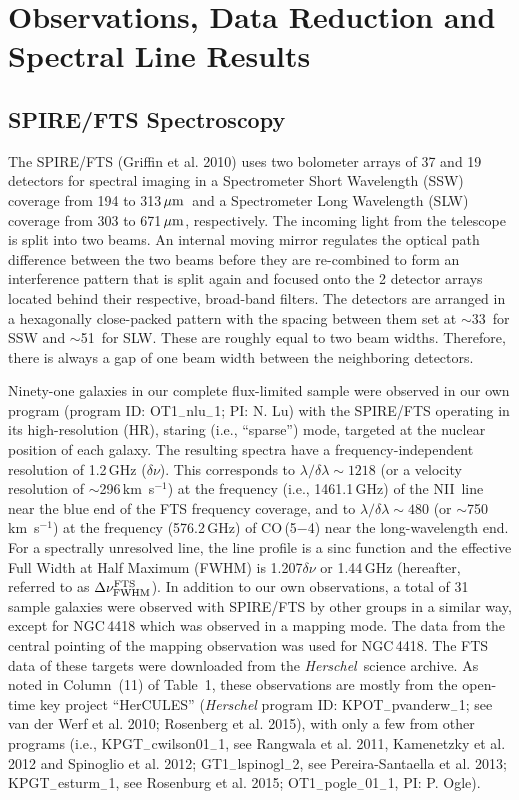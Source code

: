 \documentclass[preprint]{aastex}
\newcommand{\um}{\mbox{$\,\mu{\rm m}$}}
\newcommand{\kms}{\mbox{\,km~s$^{-1}$}}
\newcommand{\Herschel}{{\it Herschel}}
\begin{document}
\section{Observations, Data Reduction and Spectral Line Results} \label{sec3}


\subsection{SPIRE/FTS Spectroscopy} \label{sec3.1}


The SPIRE/FTS (Griffin et al. 2010) uses two bolometer arrays of 37 and 19 detectors for 
spectral imaging in a Spectrometer Short Wavelength (SSW) coverage from 194 to 313\um\ 
and a Spectrometer Long Wavelength (SLW) coverage from 303 to 671\um, respectively.  
The incoming light from the telescope is split into two beams. 
An internal moving mirror regulates the optical path difference between the two beams
before they are re-combined to form an interference pattern that is split again
and focused onto the 2 detector arrays located behind their respective, broad-band 
filters.  The detectors are arranged in a hexagonally close-packed pattern with 
the spacing between them set at $\sim$33\arcsec\ for SSW and $\sim$51\arcsec\ 
for SLW.  These are roughly equal to two beam widths. Therefore, there is always a
gap of one beam width between the neighboring detectors. 


Ninety-one galaxies in our complete flux-limited sample were observed in our own 
program (program ID: OT1$_-$nlu$_-$1; PI: N. Lu) with the SPIRE/FTS operating in 
its high-resolution (HR), staring (i.e., ``sparse'') mode, targeted at the nuclear
position of each galaxy.  
The resulting spectra have a frequency-independent
resolution of 1.2\,GHz ($\delta\nu$). This corresponds to $\lambda/\delta\lambda \sim
1218$ (or a velocity resolution of $\sim$296\kms) at the frequency (i.e., 1461.1\,GHz) 
of the NII\ line near the blue end of the FTS frequency coverage, and to 
$\lambda/\delta\lambda \sim 480$ (or $\sim$750\kms) at the frequency (576.2\,GHz) of
CO\,(5$-$4) near the long-wavelength end.  For a spectrally unresolved line, 
the line profile is a sinc function and the effective Full Width at Half Maximum 
(FWHM) is 1.207$\delta\nu$ or 1.44\,GHz (hereafter, referred to as 
$\Delta\nu^{\rm FTS}_{\rm FWHM}$).   
In addition to our own observations, a total of 31 sample galaxies were observed 
with SPIRE/FTS by other groups in a similar way, except for NGC\,4418 which was 
observed in a mapping mode.  The data from the central pointing of the mapping 
observation was used for NGC\,4418.   The FTS data of these targets were downloaded 
from the \Herschel\ science archive.  As noted in Column~(11) of Table~1, these 
observations are mostly from the open-time key project ``HerCULES'' ({\it Herschel}
program ID: KPOT$_-$pvanderw$_-$1; see van 
der Werf et al. 2010; Rosenberg et al. 2015), with only a few from other programs
(i.e., KPGT$_-$cwilson01$_-$1, see Rangwala et al. 2011, Kamenetzky et al. 2012
and Spinoglio et al. 2012;  GT1$_-$lspinogl$_-$2, see Pereira-Santaella et al. 2013;  
KPGT$_-$esturm$_-$1, see Rosenburg et al. 2015; OT1$_-$pogle$_-$01$_-$1, PI: P. Ogle). 
\end{document}
